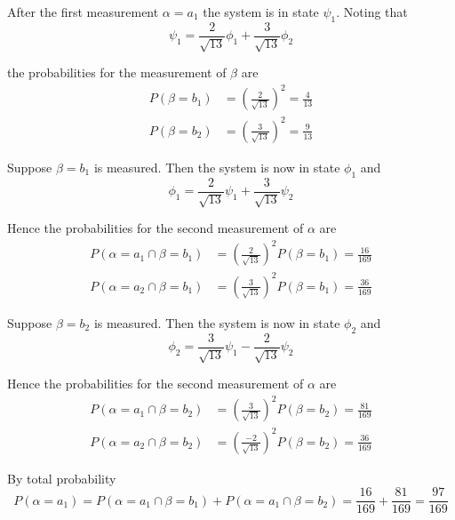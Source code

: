 After the first measurement $\alpha=a_1$ the system is in state $\psi_1$.
Noting that
\begin{equation*}
\psi_1=\frac{2}{\sqrt{13}}\phi_1+\frac{3}{\sqrt{13}}\phi_2
\end{equation*}

the probabilities for the measurement of $\beta$ are
\begin{align*}
P(\beta=b_1)&=\left(\frac{2}{\sqrt{13}}\right)^2=\frac{4}{13}
\\[1ex]
P(\beta=b_2)&=\left(\frac{3}{\sqrt{13}}\right)^2=\frac{9}{13}
\end{align*}

Suppose $\beta=b_1$ is measured.
Then the system is now in state $\phi_1$ and
\begin{equation*}
\phi_1=\frac{2}{\sqrt{13}}\psi_1+\frac{3}{\sqrt{13}}\psi_2
\end{equation*}

Hence the probabilities for the second measurement of $\alpha$ are
\begin{align*}
P(\alpha=a_1\cap\beta=b_1)
&=\left(\frac{2}{\sqrt{13}}\right)^2P(\beta=b_1)
=\frac{16}{169}
\\[1ex]
P(\alpha=a_2\cap\beta=b_1)
&=\left(\frac{3}{\sqrt{13}}\right)^2P(\beta=b_1)
=\frac{36}{169}
\end{align*}

Suppose $\beta=b_2$ is measured.
Then the system is now in state $\phi_2$ and
\begin{equation*}
\phi_2=\frac{3}{\sqrt{13}}\psi_1-\frac{2}{\sqrt{13}}\psi_2
\end{equation*}

Hence the probabilities for the second measurement of $\alpha$ are
\begin{align*}
P(\alpha=a_1\cap\beta=b_2)
&=\left(\frac{3}{\sqrt{13}}\right)^2P(\beta=b_2)
=\frac{81}{169}
\\[1ex]
P(\alpha=a_2\cap\beta=b_2)
&=\left(\frac{-2}{\sqrt{13}}\right)^2P(\beta=b_2)
=\frac{36}{169}
\end{align*}

By total probability
\begin{equation*}
P(\alpha=a_1)
=P(\alpha=a_1\cap\beta=b_1)+P(\alpha=a_1\cap\beta=b_2)
=\frac{16}{169}+\frac{81}{169}=\frac{97}{169}
\end{equation*}


